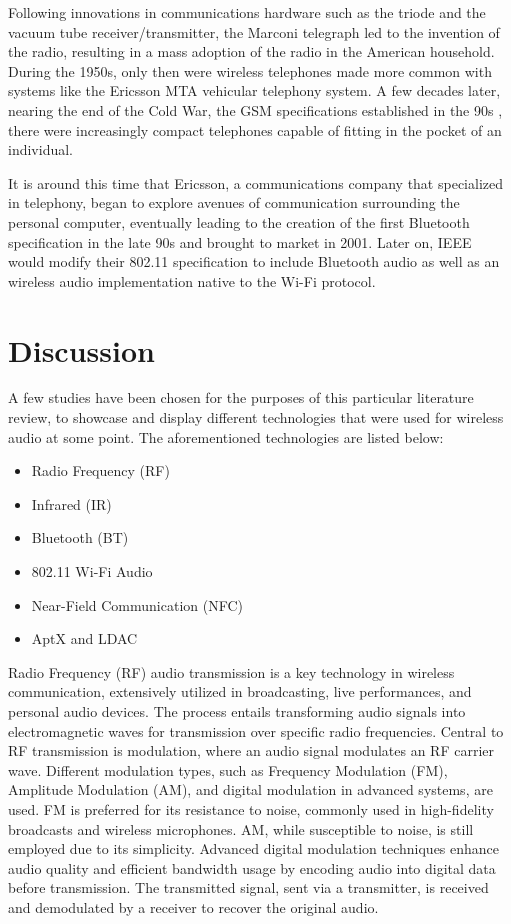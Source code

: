\documentclass[conference]{IEEEtran}
\begin{document}
Following innovations in communications hardware such as the triode and the vacuum tube
receiver/transmitter\cite{white_pre-war_2003}, the Marconi telegraph led to the invention of
the radio, resulting in a mass adoption of the radio in the American household.\cite
{noauthor_ericsson_2001} During the 1950s, only then were wireless telephones made more
common with systems like the Ericsson MTA vehicular telephony system. A few decades later,
nearing the end of the Cold War, the GSM specifications established in the 90s
\cite{suresh_introduction_2023}, there were increasingly compact telephones capable of
fitting in the pocket of an individual.\cite{noauthor_ericsson_2001}

It is around this time that Ericsson, a communications company that specialized in telephony,
began to explore avenues of communication surrounding the personal computer, eventually
leading to the creation of the first Bluetooth specification in the late 90s and brought to
market in 2001.\cite{irekvist_bluetooth_2022} Later on, IEEE would modify their 802.11
specification to include Bluetooth audio as well as an wireless audio implementation native
to the Wi-Fi protocol.\cite{noauthor_bluetooth_nodate}

\section*{Discussion}

A few studies have been chosen for the purposes of this particular literature review, to
showcase and display different technologies that were used for wireless audio at some point.
The aforementioned technologies are listed below:

\begin{itemize}
    \item Radio Frequency (RF)
    \item Infrared (IR)
    \item Bluetooth (BT)
    \item 802.11 Wi-Fi Audio
    \item Near-Field Communication (NFC)
    \item AptX and LDAC
\end{itemize}

Radio Frequency (RF) audio transmission is a key technology in wireless communication,
extensively utilized in broadcasting, live performances, and personal audio devices. The process
entails transforming audio signals into electromagnetic waves for transmission over specific
radio frequencies. Central to RF transmission is modulation, where an audio signal modulates an
RF carrier wave. Different modulation types, such as Frequency Modulation (FM), Amplitude
Modulation (AM), and digital modulation in advanced systems, are used. FM is preferred for its
resistance to noise, commonly used in high-fidelity broadcasts and wireless microphones. AM,
while susceptible to noise, is still employed due to its simplicity. Advanced digital modulation
techniques enhance audio quality and efficient bandwidth usage by encoding audio into digital
data before transmission. The transmitted signal, sent via a transmitter, is received and
demodulated by a receiver to recover the original audio.
\end{document}
